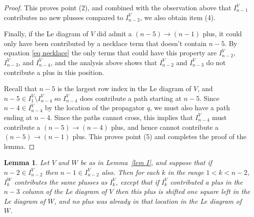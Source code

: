 \documentclass[11pt]{article}
\newtheorem{lem}[thm]{Lemma}
\theoremstyle{remark}
\theoremstyle{definition}
\begin{document}
\begin{proof}
This proves point (2), and combined with the observation above that $I_{n-1}^V$ contributes no new plusses compared to $I_{n-2}^V$, we also obtain item (4).


  Finally, if the Le diagram of $V$ did admit a $(n-5)\rightarrow (n-1)$ plus, it could only have been contributed by a necklace term that doesn't contain $n-5$.  By equation \eqref{eq necklace} the only terms that could have this property are $I_{n-2}^{V}$, $I_{n-3}^{V}$, and $I_{n-4}^{V}$, and the analysis above shows that $I_{n-2}^V$ and $I_{n-3}^V$ do not contribute a plus in this position.

  Recall that $n-5$ is the largest row index in the Le diagram of $V$, and $n-5 \in I_1^V \setminus I_{n-4}^V$ so $I_{n-4}^V$ does contribute a path starting at $n-5$. Since $n-4 \in I_{n-4}^V$ by the location of the propagator $q$, we must also have a path ending at $n-4$. Since the paths cannot cross, this implies that $I_{n-4}^V$ must contribute a $(n-5) \rightarrow (n-4)$ plus, and hence cannot contribute a $(n-5)\rightarrow (n-1)$ plus. This proves point (5) and completes the proof of the lemma.
\end{proof}



\begin{lem}\label{lem other k}
  Let $V$ and $W$ be as in Lemma~\ref{lem I}, and suppose that if $n-2\in I_{n-2}^{V}$ then $n-1\in I_{n-2}^{V}$ also. Then for each $k$ in the range $1<k<n-2$, $I_k^{W}$ contributes the same plusses as $I_{k}^{V}$, except that if $I_{k}^{V}$ contributed a plus in the $n-3$ column of the Le diagram of $V$ then this plus is shifted one square left in the Le diagram of $W$, and no plus was already in that location in the Le diagram of $W$.
\end{lem}
\end{document}
